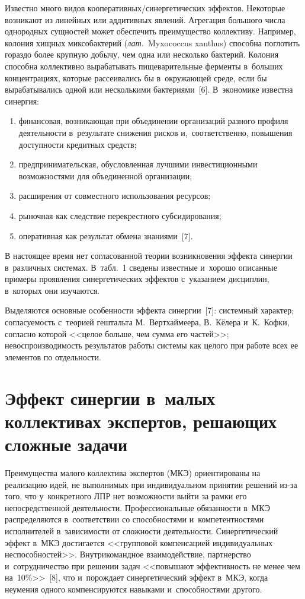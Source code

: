 \begin{multicols}{2}
  
  Известно много видов ко\-опе\-ра\-тив\-ных/си\-нер\-гети\-че\-ских 
эффектов. Некоторые возникают из линейных или аддитивных явлений. 
Агрегация большо\-го числа однородных сущностей может обеспечить 
преимущество коллективу. Например, колония хищных миксобактерий (\textit{лат.}\ 
Myxococcus xanthus) способна поглотить гораздо более крупную добычу, чем 
одна или несколько бактерий. Колония способна коллективно вырабатывать 
пищеварительные ферменты в~больших концентрациях, которые рассеивались 
бы в~окружающей среде, если бы вырабатывались одной или несколькими 
бактериями~[6]. В~экономике известна синергия: 
\begin{enumerate}[(1)]
\item финансовая, возникающая 
при объединении организаций разного профиля деятельности в~результате 
снижения рисков и,~соответственно, повышения доступности кредитных 
средств; 
\item предпринимательская, обусловленная лучшими инвестиционными 
возможностями для объединенной организации; 
\item расширения от совместного 
использования ресурсов; 
\item рыночная как следствие перекрестного 
субсидирования; 
\item оперативная как результат обмена знаниями~[7].
\end{enumerate}
  
  В настоящее время нет согласованной теории возникновения эффекта 
синергии в~различных сис\-те\-мах. В~табл.~1 сведены известные и~хорошо 
описанные примеры проявления синергетических эффектов с~указанием 
дисциплин, в~которых они изучаются. 


  Выделяются основные особенности эффекта синергии~[7]: системный 
характер; согласуемость с~теорией гештальта М.~Вертхаймеера, В.~Кёлера 
и~К.~Кофки, согласно которой <<целое больше, чем сумма его частей>>; 
невоспроизводимость результатов работы системы как целого при работе всех 
ее элементов по отдельности.

\vspace*{-6pt}

\section{Эффект синергии в~малых коллективах экспертов, 
решающих сложные задачи}

\vspace*{-2pt}

  Преимущества малого коллектива экспертов (МКЭ) ориентированы на 
реализацию идей, не выполнимых при индивидуальном принятии решений 
из-за того, что у~конкретного ЛПР нет воз\-мож\-ности выйти за рамки его 
непосредственной деятельности. Профессиональные обязанности в~МКЭ 
распределяются в~соответствии со способностями и~компетентностями 
исполнителей в~зависимости от сложности деятельности. Синергетический 
эффект в~МКЭ достигается <<групповой компенсацией индивидуальных 
неспособностей>>. Внутрикомандное взаимодействие, партнерство 
и~сотрудничество при решении задач <<повышают эффективность не менее 
чем на~10\%>>~[8], что и~порождает синергетический эффект в~МКЭ, когда 
неумения одного компенсируются навыками и~способностями другого. 
  

\end{multicols}
